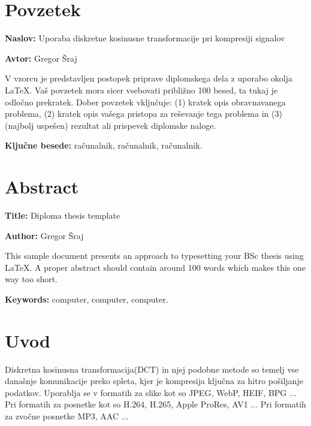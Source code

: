 \documentclass[a4paper,12pt,openright]{book}
\newcommand{\ttitle}{Uporaba diskretne kosinusne transformacije pri kompresiji signalov}
\newcommand{\ttitleEn}{Diploma thesis template}
\newcommand{\tauthor}{Gregor Šraj}
\newcommand{\tkeywords}{računalnik, računalnik, računalnik}
\newcommand{\tkeywordsEn}{computer, computer, computer}
\newcommand{\clearemptydoublepage}{\newpage{\pagestyle{empty}\cleardoublepage}}
\begin{document}
\clearemptydoublepage
\chapter*{Povzetek}

\noindent\textbf{Naslov:} \ttitle
\bigskip

\noindent\textbf{Avtor:} \tauthor
\bigskip

\noindent V vzorcu je predstavljen postopek priprave diplomskega dela z uporabo okolja \LaTeX. Vaš povzetek mora sicer vsebovati približno 100 besed, ta tukaj je odločno prekratek.
Dober povzetek vključuje: (1) kratek opis obravnavanega problema, (2) kratek opis vašega pristopa za reševanje tega problema in (3) (najbolj uspešen) rezultat ali prispevek diplomske naloge.

\bigskip

\noindent\textbf{Ključne besede:} \tkeywords.
\clearemptydoublepage
\chapter*{Abstract}

\noindent\textbf{Title:} \ttitleEn
\bigskip

\noindent\textbf{Author:} \tauthor
\bigskip

\noindent This sample document presents an approach to typesetting your BSc thesis using \LaTeX. 
A proper abstract should contain around 100 words which makes this one way too short.
\bigskip

\noindent\textbf{Keywords:} \tkeywordsEn.
\clearemptydoublepage
\mainmatter
\setcounter{page}{1}
\pagestyle{fancy}


\chapter{Uvod}
Diskretna kosinusna transformacija(DCT) in njej podobne metode so temelj vse današnje komunikacije preko spleta, kjer je kompresija ključna za hitro pošiljanje podatkov. Uporablja se v formatih za slike kot so JPEG, WebP, HEIF, BPG ... Pri formatih za posnetke kot so H.264, H.265, Apple ProRes, AV1 ... Pri formatih za zvočne posnetke MP3, AAC ... \par
\end{document}
